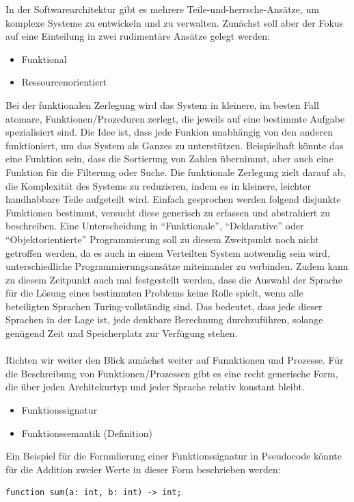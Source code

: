 In der Softwarearchitektur gibt es mehrere Teile-und-herrsche-Ansätze, um komplexe Systeme zu entwickeln und zu verwalten. Zunächst soll aber der Fokus auf eine Einteilung in zwei rudimentäre Ansätze gelegt werden:
\begin{itemize} 
\item Funktional
\item Ressourcenorientiert
\end{itemize}
Bei der funktionalen Zerlegung wird das System in kleinere, im besten Fall atomare, Funktionen/Prozeduren zerlegt, die jeweils auf eine bestimmte Aufgabe spezialisiert sind. Die Idee ist, dass jede Funkion unabhängig von den anderen funktioniert, um das System als Ganzes zu unterstützen. Beispielhaft könnte das eine Funktion sein, dass die Sortierung von Zahlen übernimmt, aber auch eine Funktion für die Filterung oder Suche. Die funktionale Zerlegung zielt darauf ab, die Komplexität des Systems zu reduzieren, indem es in kleinere, leichter handhabbare Teile aufgeteilt wird. 
Einfach gesprochen werden folgend disjunkte Funktionen bestimmt, versucht diese generisch zu erfassen und abstrahiert zu beschreiben. Eine Unterscheidung in \enquote{Funktionale}, \enquote{Deklarative} oder \enquote{Objektorientierte} Programmierung soll zu diesem Zweitpunkt noch nicht getroffen werden, da es auch in einem Verteilten System notwendig sein wird, unterschiedliche Programmierungsansätze miteinander zu verbinden. 
Zudem kann zu diesem Zeitpunkt auch mal festgestellt werden, dass die Auswahl der Sprache für die Lösung eines bestimmten Problems keine Rolle spielt, wenn alle beteiligten Sprachen Turing-vollständig sind. Das bedeutet, dass jede dieser Sprachen in der Lage ist, jede denkbare Berechnung durchzuführen, solange genügend Zeit und Speicherplatz zur Verfügung stehen.
\\\\
Richten wir weiter den Blick zunächst weiter auf Funnktionen und Prozesse. Für die Beschreibung von Funktionen/Prozessen gibt es eine recht generische Form, die über jeden Architekurtyp und jeder Sprache relativ konstant bleibt.
\begin{itemize} 
\item Funktionssignatur 
\item Funktionssemantik (Definition)
\end{itemize}
Ein Beispiel für die Formulierung einer Funktionssignatur in Pseudocode könnte für die Addition zweier Werte in dieser Form beschrieben werden:
\begin{lstlisting}[caption={Funktionssignatur},captionpos=b,label={lst:signatur}]
    function sum(a: int, b: int) -> int;
\end{lstlisting}
